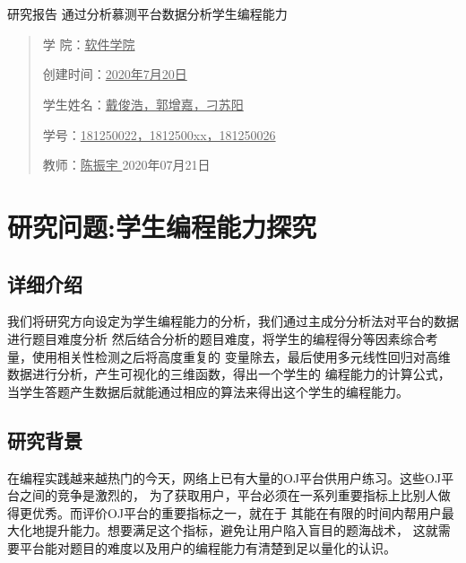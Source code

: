 \documentclass[UTF8]{ctexart}
\date{}
\begin{document}
\ttfamily \songti
{}

\begin{center}
    \quad \\
    \quad \\
    \heiti \fontsize{45}{17} 研\quad 究\quad 报\quad 告
    \vskip 3.5cm
    \heiti {} 通过分析慕测平台数据分析学生编程能力	
\end{center}
\vskip 3.5cm

\begin{quotation}
    \songti \fontsize{15}{15}
    \doublespacing
    \par\setlength\parindent{12em}
    \quad 

    学\hspace{0.61cm} 院：\underline{\quad 软件学院\quad}

    创建时间：\underline{2020年7月20日}

    学生姓名：\underline{戴俊浩，郭增嘉，刁苏阳}

    学\hspace{0.61cm}号：\underline{\small 181250022，1812500xx，181250026}

    教\hspace{0.61cm}师：\underline{\qquad 陈振宇 \qquad}
    \vskip 2cm
    \centering
    2020年07月21日
\end{quotation}

\newpage
\tableofcontents
\newpage
\section{研究问题:学生编程能力探究}
\subsection{详细介绍}
我们将研究方向设定为学生编程能力的分析，我们通过主成分分析法对平台的数据进行题目难度分析
然后结合分析的题目难度，将学生的编程得分等因素综合考量，使用相关性检测之后将高度重复的
变量除去，最后使用多元线性回归对高维数据进行分析，产生可视化的三维函数，得出一个学生的
编程能力的计算公式，当学生答题产生数据后就能通过相应的算法来得出这个学生的编程能力。
\subsection{研究背景}
在编程实践越来越热门的今天，网络上已有大量的OJ平台供用户练习。这些OJ平台之间的竞争是激烈的，
为了获取用户，平台必须在一系列重要指标上比别人做得更优秀。而评价OJ平台的重要指标之一，就在于
其能在有限的时间内帮用户最大化地提升能力。想要满足这个指标，避免让用户陷入盲目的题海战术，
这就需要平台能对题目的难度以及用户的编程能力有清楚到足以量化的认识。
\end{document}
